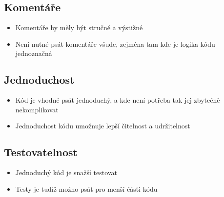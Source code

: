 \documentclass{article}
\begin{document}
\begin{Čistý kód - Funkce}
        \subsection{Komentáře}\label{subsec:komentare}
        \begin{itemize}
            \item Komentáře by měly být stručné a výstižné
            \item Není nutné psát komentáře všude, zejména tam kde je logika kódu jednoznačná
        \end{itemize}

        \subsection{Jednoduchost}\label{subsec:jednoduchost}
        \begin{itemize}
            \item Kód je vhodné psát jednoduchý, a kde není potřeba tak jej zbytečně nekomplikovat
            \item Jednoduchost kódu umožnuje lepší čitelnost a udržitelnost
        \end{itemize}

        \subsection{Testovatelnost}\label{subsec:testovatelnost}
        \begin{itemize}
            \item Jednoduchý kód je snažší testovat
            \item Testy je tudíž možno psát pro menší části kódu
        \end{itemize}



\end{Čistý kód - Funkce}
\end{document}
